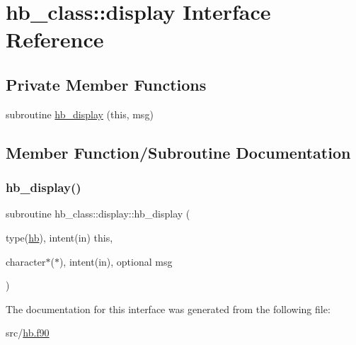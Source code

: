 \hypertarget{interfacehb__class_1_1display}{}\section{hb\+\_\+class\+:\+:display Interface Reference}
\label{interfacehb__class_1_1display}
\subsection*{Private Member Functions}
\begin{DoxyCompactItemize}
\item 
subroutine \hyperlink{interfacehb__class_1_1display_ac9bf2c27966be0c6535716e8603f22aa}{hb\+\_\+display} (this, msg)
\end{DoxyCompactItemize}


\subsection{Member Function/\+Subroutine Documentation}
\mbox{\label{interfacehb__class_1_1display_ac9bf2c27966be0c6535716e8603f22aa}} 
\subsubsection{\texorpdfstring{hb\+\_\+display()}{hb\_display()}}
{\footnotesize\ttfamily subroutine hb\+\_\+class\+::display\+::hb\+\_\+display (\begin{DoxyParamCaption}\item[{type(\hyperlink{structhb__class_1_1hb}{hb}), intent(in)}]{this,  }\item[{character$\ast$($\ast$), intent(in), optional}]{msg }\end{DoxyParamCaption})\hspace{0.3cm}{\ttfamily [private]}}



The documentation for this interface was generated from the following file\+:\begin{DoxyCompactItemize}
\item 
src/\hyperlink{hb_8f90}{hb.\+f90}\end{DoxyCompactItemize}
